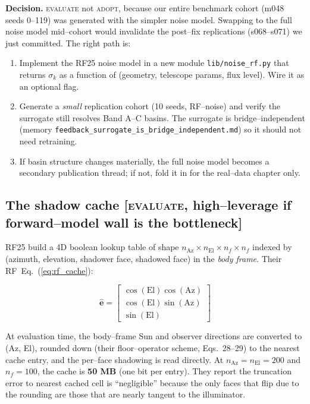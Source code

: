 \documentclass[11pt]{article}
\newcommand{\ttt}[1]{\texttt{#1}}
\newcommand{\rf}[1]{RF~Eq.~(\ref{#1})}  %
\begin{document}
\textbf{Decision.} \textsc{evaluate} not \textsc{adopt}, because our entire
benchmark cohort (m048 seeds 0--119) was generated with the simpler noise
model. Swapping to the full noise model mid--cohort would invalidate the
post--fix replications (s068--s071) we just committed. The right path is:

\begin{enumerate}
\item Implement the RF25 noise model in a new module \ttt{lib/noise\_rf.py}
that returns $\sigma_k$ as a function of (geometry, telescope params,
flux level). Wire it as an optional flag.
\item Generate a \emph{small} replication cohort (10 seeds, RF--noise) and
verify the surrogate still resolves Band A--C basins. The surrogate is
bridge--independent (memory \ttt{feedback\_surrogate\_is\_bridge\_independent.md})
so it should not need retraining.
\item If basin structure changes materially, the full noise model becomes a
secondary publication thread; if not, fold it in for the real--data
chapter only.
\end{enumerate}

\subsection{The shadow cache \textnormal{[\textsc{evaluate}, high--leverage if forward--model wall is the bottleneck]}}
\label{ssec:shadow_cache}

\noindent
RF25 build a 4D boolean lookup table of shape $n_{\mathrm{Az}} \times
n_{\mathrm{El}} \times n_f \times n_f$ indexed by (azimuth, elevation, shadower
face, shadowed face) in the \emph{body frame}. Their \rf{eq:rf_cache}:

\begin{equation}
\label{eq:rf_cache}
\hat{\mathbf{e}} = \begin{bmatrix} \cos(\mathrm{El}) \cos(\mathrm{Az}) \\
                                   \cos(\mathrm{El}) \sin(\mathrm{Az}) \\
                                   \sin(\mathrm{El}) \end{bmatrix}
\end{equation}

\noindent
At evaluation time, the body--frame Sun and observer directions are converted
to (Az, El), rounded down (their floor--operator scheme, Eqs.~28--29) to the
nearest cache entry, and the per--face shadowing is read directly. At
$n_{\mathrm{Az}} = n_{\mathrm{El}} = 200$ and $n_f = 100$, the cache is
\textbf{50 MB} (one bit per entry). They report the truncation error to
nearest cached cell is ``negligible'' because the only faces that flip due to
the rounding are those that are nearly tangent to the illuminator.
\end{document}
